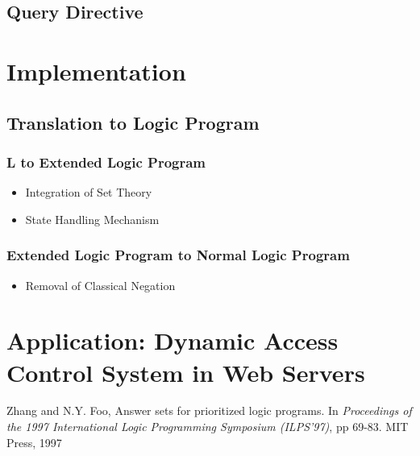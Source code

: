 \documentclass{llncs}
\begin{document}
    \subsection{Query Directive}

  \section{Implementation}

    \subsection{Translation to Logic Program}

      \subsubsection{L to Extended Logic Program}

        \begin{itemize}
          \item Integration of Set Theory
          \item State Handling Mechanism
        \end{itemize}

      \subsubsection{Extended Logic Program to Normal Logic Program}

        \begin{itemize}
          \item Removal of Classical Negation
        \end{itemize}

  \section{Application: Dynamic Access Control System in Web Servers}

  \begin{thebibliography}{5}

      Zhang and N.Y. Foo,
      Answer sets for prioritized logic programs.
      In {\em Proceedings of the 1997 International Logic Programming
      Symposium (ILPS'97)},
      pp 69-83. 
      MIT Press, 1997

  \end{thebibliography}
\end{document}
